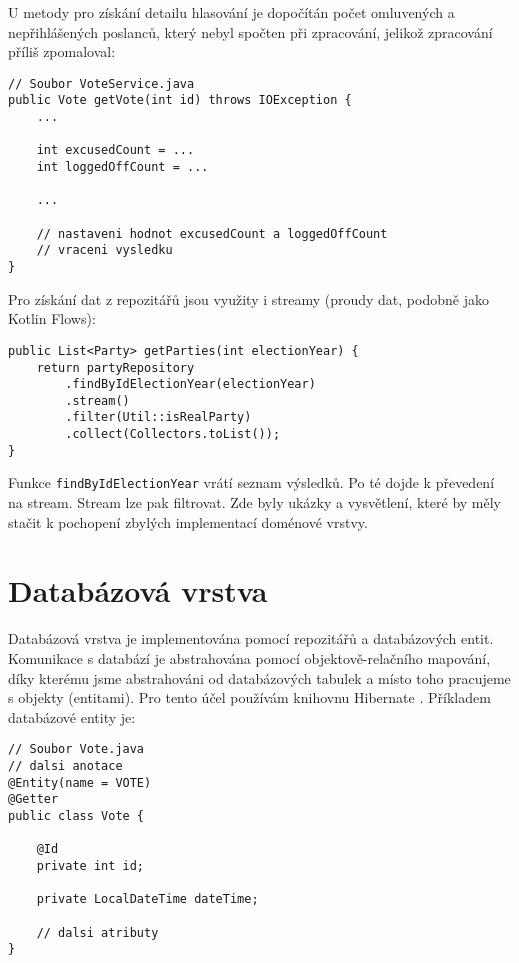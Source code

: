 \noindent U metody pro získání detailu hlasování je dopočítán počet omluvených a nepřihlášených \linebreak poslanců, který nebyl spočten při zpracování, jelikož zpracování příliš zpomaloval:

\begin{lstlisting}[caption={Ukázka dopočtu statistik pro detail hlasování za běhu v doménové vrstvě}, label={lst:excused-count}, tabsize=2]
// Soubor VoteService.java
public Vote getVote(int id) throws IOException {
	...
	
	int excusedCount = ... 	
	int loggedOffCount = ...
	
	...
	
	// nastaveni hodnot excusedCount a loggedOffCount
	// vraceni vysledku
}
\end{lstlisting}

\noindent Pro získání dat z repozitářů jsou využity i streamy (proudy dat, podobně jako Kotlin Flows):

\begin{lstlisting}[caption={Ukázka použití streamu}, tabsize=2]
public List<Party> getParties(int electionYear) {
	return partyRepository
		.findByIdElectionYear(electionYear)
		.stream()
		.filter(Util::isRealParty)
		.collect(Collectors.toList());
}
\end{lstlisting}

\noindent Funkce \lstinline|findByIdElectionYear| vrátí seznam výsledků. Po té dojde k převedení na stream. Stream lze pak filtrovat. Zde byly ukázky a vysvětlení, které by měly stačit k pochopení zbylých implementací doménové vrstvy.

\section {Databázová vrstva}
Databázová vrstva je implementována pomocí repozitářů a databázových entit. Komunikace \linebreak s databází je abstrahována pomocí objektově-relačního mapování, díky kterému jsme abstrahováni od databázových tabulek a místo toho pracujeme s objekty (entitami). Pro tento účel používám knihovnu Hibernate \cite{hibernate}. Příkladem databázové entity je:

\begin{lstlisting}[caption={Entita Vote reprezentující hlasování}, label={lst:vote-entity}, tabsize=2]
// Soubor Vote.java
// dalsi anotace
@Entity(name = VOTE)
@Getter
public class Vote {
	
	@Id
	private int id;
	
	private LocalDateTime dateTime;
	
	// dalsi atributy
}
	
\end{lstlisting}

